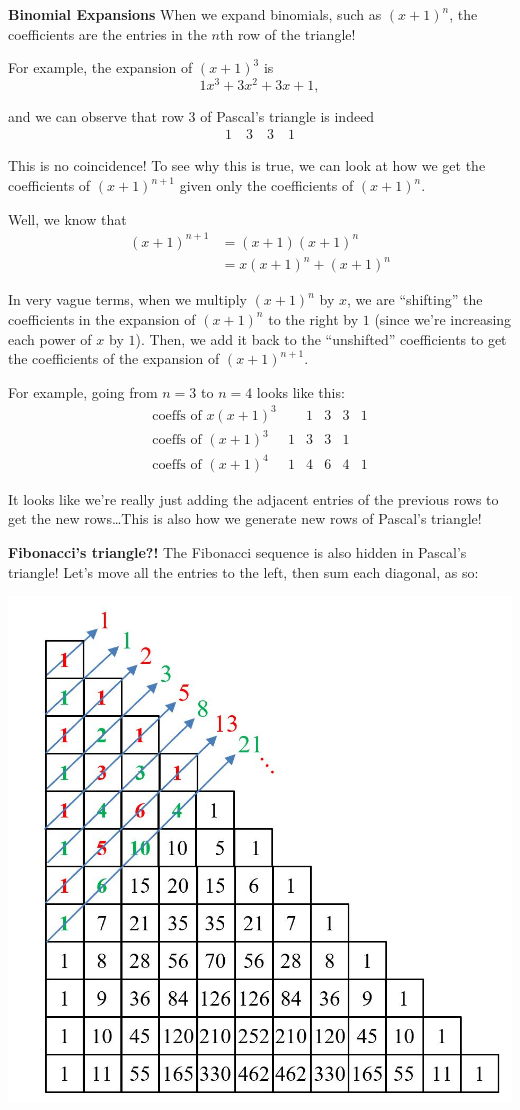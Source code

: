 \documentclass{article}
\begin{document}
\textbf{Binomial Expansions}
When we expand binomials, such as $(x+1)^n$, the coefficients are the entries in the $n$th row of the triangle! 

For example, the expansion of $(x+1)^3$ is 
\[1x^3+3x^2+3x+1,\]

and we can observe that row $3$ of Pascal's triangle is indeed 
\[
	\begin{array}{c}1\quad3\quad3\quad1\end{array}
\]

This is no coincidence! To see why this is true, we can look at how we get the coefficients of $(x+1)^{n+1}$ given only the coefficients of $(x+1)^n$.

Well, we know that
\begin{align*}
	(x+1)^{n+1}&=(x+1)(x+1)^n \\
			   &= x(x+1)^n+(x+1)^n
\end{align*}

In very vague terms, when we multiply $(x+1)^n$ by $x$, we are ``shifting'' the coefficients in the expansion of $(x+1)^n$ to the right by $1$ (since we're increasing each power of $x$ by $1$). Then, we add it back to the ``unshifted'' coefficients to get the coefficients of the expansion of $(x+1)^{n+1}$. 

For example, going from $n=3$ to $n=4$ looks like this:
\[
\begin{array}{c|ccccc}
\text{coeffs of } x(x+1)^3 & &1&3&3&1 \\
\text{coeffs of } (x+1)^3 & 1&3&3&1& \\
\hline
\text{coeffs of } (x+1)^4 & 1&4&6&4&1
\end{array}
\]

It looks like we're really just adding the adjacent entries of the previous rows to get the new rows\dots This is also how we generate new rows of Pascal's triangle! 

\textbf{Fibonacci's triangle?!}
The Fibonacci sequence is also hidden in Pascal's triangle! Let's move all the entries to the left, then sum each diagonal, as so:

\begin{center}
	\includegraphics[width = 2 in]{images/pascal1.png}
\end{center}
\end{document}
